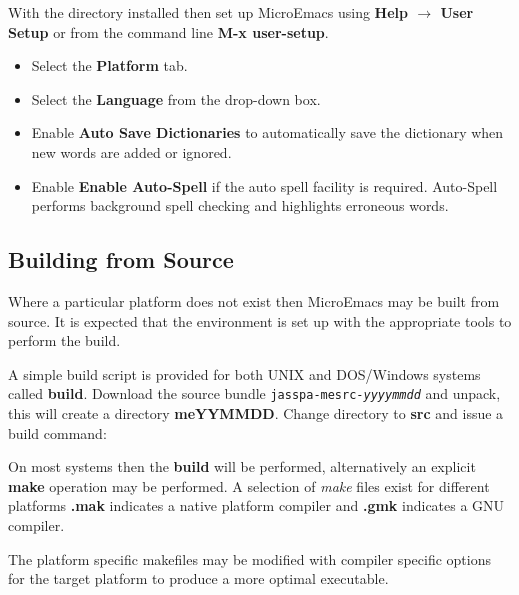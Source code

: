 \documentclass[11pt,a4paper,pdftex]{article}
\begin{document}
  With the directory installed then set up MicroEmacs using \textbf{Help
  $\rightarrow$ User Setup} or from the command line \textbf{M-x user-setup}.

  \begin{itemize}
    \item Select the \textbf{Platform} tab.

    \item Select the \textbf{Language} from the drop-down box.

    \item Enable \textbf{Auto Save Dictionaries} to automatically save the
    dictionary when new words are added or ignored.

    \item Enable \textbf{Enable Auto-Spell} if the auto spell facility is
    required. Auto-Spell performs background spell checking and highlights
    erroneous words.

  \end{itemize}

\subsection{Building from Source}

  Where a particular platform does not exist then MicroEmacs may be built from
  source. It is expected that the environment is set up with the appropriate
  tools to perform the build.

  A simple build script is provided for both UNIX and DOS/Windows systems
  called \textbf{build}. Download the source bundle
  \texttt{jasspa-mesrc-\textit{yyyymmdd}} and unpack, this will create a
  directory \textbf{meYYMMDD}. Change directory to \textbf{src} and issue a
  build command:



  On most systems then the \textbf{build} will be performed, alternatively an
  explicit \textbf{make} operation may be performed. A selection of
  \textit{make} files exist for different platforms \textbf{.mak}
  indicates a native platform compiler and \textbf{.gmk} indicates a GNU
  compiler.


  The platform specific makefiles may be modified with compiler specific
  options for the target platform to produce a more optimal executable.
\end{document}
